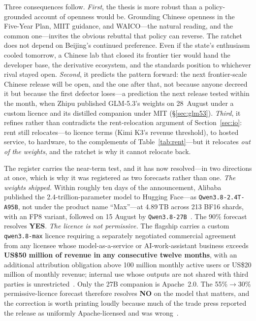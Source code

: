 Three consequences follow. \emph{First}, the thesis is more robust than a policy-grounded account of openness would be. Grounding Chinese openness in the Five-Year Plan, MIIT guidance, and WAICO---the natural reading, and the common one---invites the obvious rebuttal that policy can reverse. The ratchet does not depend on Beijing's continued preference. Even if the state's enthusiasm cooled tomorrow, a Chinese lab that closed its frontier tier would hand the developer base, the derivative ecosystem, and the standards position to whichever rival stayed open. \emph{Second}, it predicts the pattern forward: the next frontier-scale Chinese release will be open, and the one after that, not because anyone decreed it but because the first defector loses---a prediction the next release tested within the month, when Zhipu published GLM-5.3's weights on 28~August under a custom licence and its distilled companion under MIT (\S\ref{sec:glm53}). \emph{Third}, it refines rather than contradicts the rent-relocation argument of Section~\ref{sec:io}: rent still relocates---to licence terms (Kimi K3's revenue threshold), to hosted service, to hardware, to the complements of Table~\ref{tab:rent}---but it relocates \emph{out of the weights}, and the ratchet is why it cannot relocate back.

The register carries the near-term test, and it has now resolved---in two directions at once, which is why it was registered as two forecasts rather than one. \emph{The weights shipped.} Within roughly ten days of the announcement, Alibaba published the 2.4-trillion-parameter model to Hugging Face---as \texttt{Qwen3.8-2.4T-A95B}, not under the product name ``Max''---at 4.89\,TB across 213 BF16 shards, with an FP8 variant, followed on 15 August by \texttt{Qwen3.8-27B}~\cite{qwen38-weights,qwen38-scmp}. The 90\% forecast resolves \textbf{YES}. \emph{The licence is not permissive.} The flagship carries a custom \texttt{qwen3.8-max} licence requiring a separately negotiated commercial agreement from any licensee whose model-as-a-service or AI-work-assistant business exceeds \textbf{US\$50 million of revenue in any consecutive twelve months}, with an additional attribution obligation above 100 million monthly active users or US\$20 million of monthly revenue; internal use whose outputs are not shared with third parties is unrestricted~\cite{qwen38-weights}. Only the 27B companion is Apache~2.0. The 55\%$\to$30\% permissive-licence forecast therefore resolves \textbf{NO} on the model that matters, and the correction is worth printing loudly because much of the trade press reported the release as uniformly Apache-licensed and was wrong~\cite{qwen38-scmp}.

